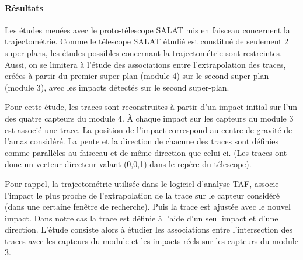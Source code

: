   \paragraph{R\'esultats}

  Les \'etudes men\'ees avec le proto-t\'elescope SALAT mis en faisceau concernent la trajectom\'etrie. Comme le t\'elescope SALAT \'etudi\'e est constitu\'e de seulement 2 super-plans, les études possibles concernant la trajectom\'etrie sont restreintes. Aussi, on se limitera \`a l'\'etude des associations entre l'extrapolation des traces, cr\'e\'ees \`a partir du premier super-plan (module 4) sur le second super-plan (module 3), avec les impacts d\'etect\'es sur le second super-plan.
  
  \medskip

  Pour cette \'etude, les traces sont reconstruites \`a partir d'un impact initial sur l'un des quatre capteurs du module 4. \`A chaque impact sur les capteurs du module 3 est associ\'e une trace. La position de l'impact correspond au centre de gravit\'e de l'amas consid\'er\'e. La pente et la direction de chacune des traces sont d\'efinies comme parall\`eles au faisceau et de m\^eme direction que celui-ci. (Les traces ont donc un vecteur directeur valant (0,0,1) dans le rep\`ere du t\'elescope).
  
  \medskip

  Pour rappel, la trajectom\'etrie utilis\'ee dans le logiciel d'analyse TAF, associe l'impact le plus proche de l'extrapolation de la trace sur le capteur consid\'er\'e (dans une certaine fen\^etre de recherche). Puis la trace est ajust\'ee avec le nouvel impact. Dans notre cas la trace est d\'efinie \`a l'aide d'un seul impact et d'une direction. L'\'etude consiste alors \`a \'etudier les associations entre l'intersection des traces avec les capteurs du module et les impacts  r\'eels sur les capteurs du module 3.
  
